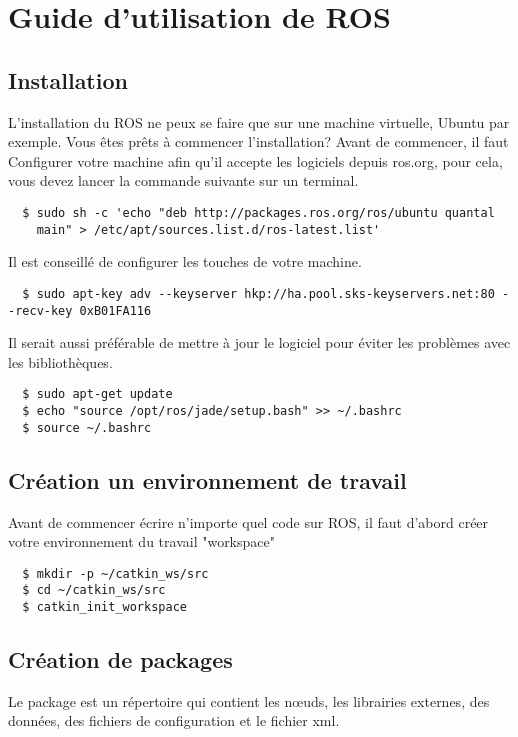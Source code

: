 \documentclass[a4paper,french, titlepage]{book}
\begin{document}
\newpage

\appendix
{}

\chapter{Guide d'utilisation de ROS\label{annexe_ROS}}

\section{Installation}

L'installation du ROS ne peux se faire que sur une machine virtuelle, Ubuntu par exemple. Vous êtes prêts à commencer l'installation? Avant de commencer, il faut Configurer votre machine afin qu'il accepte les logiciels depuis ros.org, pour cela, vous devez lancer la commande suivante sur un terminal.
\begin{Verbatim}
  $ sudo sh -c 'echo "deb http://packages.ros.org/ros/ubuntu quantal
    main" > /etc/apt/sources.list.d/ros-latest.list'
\end{Verbatim}
Il est conseillé de configurer les touches de votre machine. 
\begin{Verbatim}
  $ sudo apt-key adv --keyserver hkp://ha.pool.sks-keyservers.net:80 --recv-key 0xB01FA116
\end{Verbatim}
Il serait aussi préférable de mettre à jour le logiciel pour éviter les problèmes avec les bibliothèques.
\begin{Verbatim}
  $ sudo apt-get update
  $ echo "source /opt/ros/jade/setup.bash" >> ~/.bashrc
  $ source ~/.bashrc
\end{Verbatim}

\section{Création un environnement de travail}

Avant de commencer écrire n'importe quel code sur ROS, il faut d'abord créer votre environnement du travail "workspace"
\begin{Verbatim}
  $ mkdir -p ~/catkin_ws/src
  $ cd ~/catkin_ws/src
  $ catkin_init_workspace 
\end{Verbatim}

\section{Création de packages}
Le package est un répertoire qui contient les nœuds, les librairies externes, des données, des fichiers de configuration et le fichier xml. 
\end{document}

